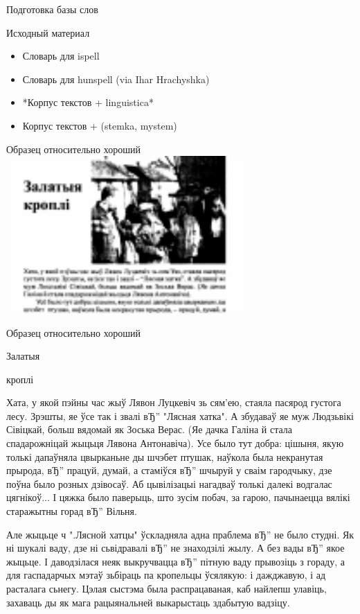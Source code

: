 \documentclass{beamer}
\begin{document}
\begin{frame}{Подготовка базы слов}
\begin{block}{Исходный материал}
\begin{itemize}
\item Словарь для ispell
\item Словарь для hunspell (via Ihar Hrachyshka)
\item *Корпус текстов + linguistica*
\item Корпус текстов + (stemka, mystem)
\end{itemize}
\end{block}
\end{frame}
\begin{frame}{Образец относительно хороший}
\includegraphics[height=60mm]{sample.pdf}
\end{frame}
\begin{frame}{Образец относительно хороший}

Залатыя 

кроплі

Хата, у якой пэйны час жыў Лявон Луцкевіч зь сям'ею, стаяла пасярод густога лесу. Зрэшты, яе ўсе так і звалі вЂ” "Лясная хатка". А збудаваў яе муж Людзьвікі Сівіцкай, больш вядомай як Зоська Верас. (Яе дачка Галіна й стала спадарожніцай жыцьця Лявона Антонавіча). 
Усе было тут добра: цішыня, якую толькі дапаўняла цвырканьне ды шчэбет птушак, наўкола была некранутая прырода, вЂ” працуй, думай, а стаміўся вЂ” шчыруй у сваім гародчыку, дзе поўна было розных дзівосаў. Аб цывілізацыі нагадваў толькі далекі водгалас цягнікоў... І цяжка было паверыць, што зусім побач, за гарою, пачынаецца вялікі старажытны горад вЂ” Вільня. 

Але жыцьце ч ".Лясной хатцы" ўскладняла адна праблема вЂ” не было студні. Як ні шукалі ваду, дзе ні сьвідравалі вЂ” не знаходзілі жылу. А без вады вЂ” якое жыцьце. І даводзілася неяк выкручвацца вЂ” пітную ваду прывозіць з гораду, а для гаспадарчых мэтаў зьбіраць па кропельцы ўсялякую: і дажджавую, і ад расталага сьнегу. Цэлая сыстэма была распрацаваная, каб найлепш улавіць, захаваць ды як мага рацыянальней выкарыстаць здабытую вадзіцу. 

\end{frame}
\end{document}
